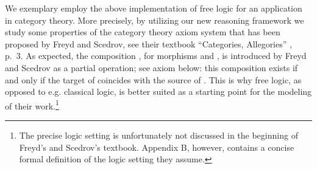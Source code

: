 %
\begin{isabellebody}%
%
%
\isadelimtheory
%
\endisadelimtheory
%
\isatagtheory
%
\endisatagtheory
{\isafoldtheory}%
%
\isadelimtheory
%
\endisadelimtheory
%
\isamarkuptrue%
%
\begin{isamarkuptext}%
We exemplary employ the above implementation of free logic for an application in
category theory. More precisely, by utilizing our new reasoning framework we study some
properties of the category theory axiom system that has been proposed by Freyd and 
Scedrov, see their textbook ``Categories, Allegories'' \cite{FreydScedrov90}, p.~3. 
As expected, the composition , for morphisms  and 
,  is introduced by Freyd and Scedrov as a partial operation; see axiom  below: 
this composition exists if and only if the target of  coincides with the source 
of . This is why free logic, as opposed to e.g. classical logic, is better suited as a 
starting point for the modeling of their work.\footnote{The precise logic setting is unfortunately 
not discussed in the beginning of Freyd's and Scedrov's textbook. Appendix B, however, contains 
a concise formal definition of the logic setting they assume.}


\end{isamarkuptext}
\end{isabellebody}
